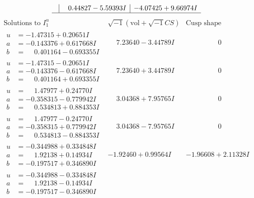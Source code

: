 \documentclass[1p]{elsarticle_modified}
\theoremstyle{definition}
\newcommand{\I}{\sqrt{-1}}
\begin{document}
$$\begin{array}{c|c|c}
 & \phantom{-}0.44827 - 5.59393 I & -4.07425 + 9.66974 I\\
 \hline 
 \end{array}$$\newpage$$\begin{array}{c|c|c}  
\text{Solutions to }I^u_{1}& \I (\text{vol} + \sqrt{-1}CS) & \text{Cusp shape}\\
 \hline 
\begin{aligned}
u &= -1.47315 + 0.20651 I \\
a &= -0.143376 + 0.617668 I \\
b &= \phantom{-}0.401164 - 0.693355 I\end{aligned}
 & \phantom{-}7.23640 - 3.44789 I & \phantom{-0.000000 } 0 \\ \hline\begin{aligned}
u &= -1.47315 - 0.20651 I \\
a &= -0.143376 - 0.617668 I \\
b &= \phantom{-}0.401164 + 0.693355 I\end{aligned}
 & \phantom{-}7.23640 + 3.44789 I & \phantom{-0.000000 } 0 \\ \hline\begin{aligned}
u &= \phantom{-}1.47977 + 0.24770 I \\
a &= -0.358315 - 0.779942 I \\
b &= \phantom{-}0.534813 + 0.884353 I\end{aligned}
 & \phantom{-}3.04368 + 7.95765 I & \phantom{-0.000000 } 0 \\ \hline\begin{aligned}
u &= \phantom{-}1.47977 - 0.24770 I \\
a &= -0.358315 + 0.779942 I \\
b &= \phantom{-}0.534813 - 0.884353 I\end{aligned}
 & \phantom{-}3.04368 - 7.95765 I & \phantom{-0.000000 } 0 \\ \hline\begin{aligned}
u &= -0.344988 + 0.334848 I \\
a &= \phantom{-}1.92138 + 0.14934 I \\
b &= -0.197517 + 0.346890 I\end{aligned}
 & -1.92460 + 0.99564 I & -1.96608 + 2.11328 I \\ \hline\begin{aligned}
u &= -0.344988 - 0.334848 I \\
a &= \phantom{-}1.92138 - 0.14934 I \\
b &= -0.197517 - 0.346890 I\end{aligned}

\end{array}$$
\end{document}
